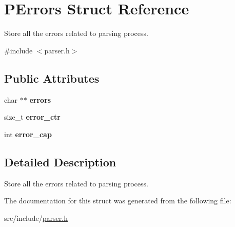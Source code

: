 \hypertarget{struct_p_errors}{}\section{P\+Errors Struct Reference}
\label{struct_p_errors}


Store all the errors related to parsing process.  




{\ttfamily \#include $<$parser.\+h$>$}

\subsection*{Public Attributes}
\begin{DoxyCompactItemize}
\item 
\mbox{\label{struct_p_errors_a74b55645ec9d07d6ea3a070bb815ef5f}} 
char $\ast$$\ast$ {\bfseries errors}
\item 
\mbox{\label{struct_p_errors_af2d1ba532705f2e7b62c2f9cd6c5d694}} 
size\+\_\+t {\bfseries error\+\_\+ctr}
\item 
\mbox{\label{struct_p_errors_a8df3e4bfd3b12b93a16069ca24116ca3}} 
int {\bfseries error\+\_\+cap}
\end{DoxyCompactItemize}


\subsection{Detailed Description}
Store all the errors related to parsing process. 

The documentation for this struct was generated from the following file\+:\begin{DoxyCompactItemize}
\item 
src/include/\mbox{\hyperlink{parser_8h}{parser.\+h}}\end{DoxyCompactItemize}
